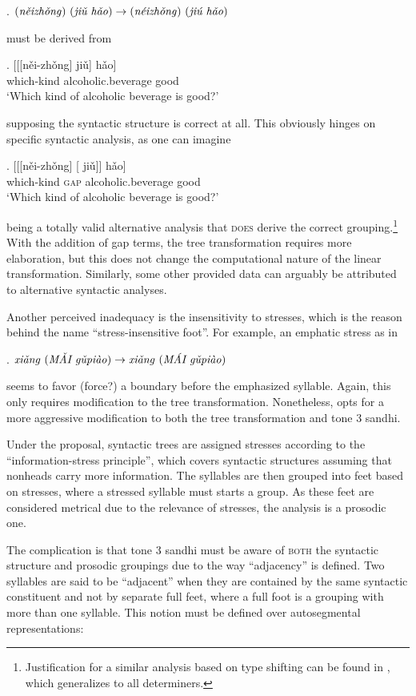 \documentclass[12pt, a4paper]{report}
\newcommand{\gap}{\underline{\hspace{1em}}}
\newcommand{\textemph}[1]{\textsc{#1}}
\newcommand{\textfeat}[1]{\textsc{#1}}
\newcommand{\textform}[1]{\textit{#1}}
\newcommand{\textgls}[1]{`#1'}
\begin{document}
\ex. \(\text{(\textform{něizhǒng}) (\textform{jiǔ hǎo})} \to
\text{(\textform{néizhǒng}) (\textform{jiú hǎo})}\)

must be derived from

\exg. [[[něi-zhǒng] jiǔ] hǎo]\\
\phantom{[[[}which-kind alcoholic.beverage good\\
\trans\textgls{Which kind of alcoholic beverage is good?}

supposing the syntactic structure is correct at all.  This obviously
hinges on specific syntactic analysis, as one can imagine

\exg. [[[něi-zhǒng] [\gap{} jiǔ]] hǎo]\\
\phantom{[[[}which-kind \phantom{[}\textfeat{gap} alcoholic.beverage
good\\
\trans\textgls{Which kind of alcoholic beverage is good?}

being a totally valid alternative analysis that \textemph{does} derive
the correct grouping.\footnote{Justification for a similar analysis
  based on type shifting can be found in \textcite{bs14cnl}, which
  generalizes to all determiners.}  With the addition of gap terms,
the tree transformation requires more elaboration, but this does not
change the computational nature of the linear transformation.
Similarly, some other provided data can arguably be attributed to
alternative syntactic analyses.

Another perceived inadequacy is the insensitivity to stresses, which
is the reason behind the name \enquote{stress-insensitive foot}.  For
example, an emphatic stress as in

\ex. \(\text{\textform{xiǎng} (\textform{MǍI gǔpiào})} \to
\text{\textform{xiǎng} (\textform{MÁI gǔpiào})}\)

seems to favor (force?) a boundary before the emphasized syllable.
Again, this only requires modification to the tree transformation.
Nonetheless, \textcite{d07psc} opts for a more aggressive modification
to both the tree transformation and tone 3 sandhi.

Under the proposal, syntactic trees are assigned stresses according to
the \enquote{information-stress principle}, which covers syntactic
structures assuming that nonheads carry more information.  The
syllables are then grouped into feet based on stresses, where a
stressed syllable must starts a group.  As these feet are considered
metrical due to the relevance of stresses, the analysis is a prosodic
one.

The complication is that tone 3 sandhi must be aware of
\textemph{both} the syntactic structure and prosodic groupings due to
the way \enquote{adjacency} is defined.  Two syllables are said to be
\enquote{adjacent} when they are contained by the same syntactic
constituent and not by separate full feet, where a full foot is a
grouping with more than one syllable.  This notion must be defined
over autosegmental representations:
\end{document}
